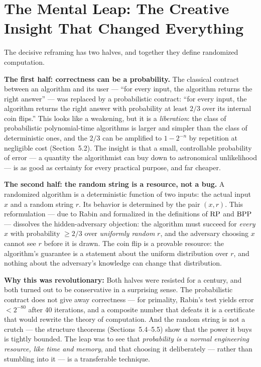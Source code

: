\section{The Mental Leap: The Creative Insight That Changed Everything}
\label{sec:randomized:leap}

The decisive reframing has two halves, and together they define randomized computation.

\textbf{The first half: correctness can be a probability.} The classical contract between an algorithm and its user --- ``for every input, the algorithm returns the right answer'' --- was replaced by a probabilistic contract: ``for every input, the algorithm returns the right answer with probability at least $2/3$ over its internal coin flips.'' This looks like a weakening, but it is a \emph{liberation}: the class of probabilistic polynomial-time algorithms is larger and simpler than the class of deterministic ones, and the $2/3$ can be amplified to $1 - 2^{-n}$ by repetition at negligible cost (Section~5.2). The insight is that a small, controllable probability of error --- a quantity the algorithmist can buy down to astronomical unlikelihood --- is as good as certainty for every practical purpose, and far cheaper.

\textbf{The second half: the random string is a resource, not a bug.} A randomized algorithm is a deterministic function of two inputs: the actual input $x$ and a random string $r$. Its behavior is determined by the pair $(x, r)$. This reformulation --- due to Rabin and formalized in the definitions of $\text{RP}$ and $\text{BPP}$ --- dissolves the hidden-adversary objection: the algorithm must succeed for \emph{every} $x$ with probability $\ge 2/3$ over \emph{uniformly random} $r$, and the adversary choosing $x$ cannot see $r$ before it is drawn. The coin flip is a provable resource: the algorithm's guarantee is a statement about the uniform distribution over $r$, and nothing about the adversary's knowledge can change that distribution.

\textbf{Why this was revolutionary:} Both halves were resisted for a century, and both turned out to be conservative in a surprising sense. The probabilistic contract does not give away correctness --- for primality, Rabin's test yields error $< 2^{-80}$ after 40 iterations, and a composite number that defeats it is a certificate that would rewrite the theory of computation. And the random string is not a crutch --- the structure theorems (Sections~5.4--5.5) show that the power it buys is tightly bounded. The leap was to see that \emph{probability is a normal engineering resource, like time and memory}, and that choosing it deliberately --- rather than stumbling into it --- is a transferable technique.

